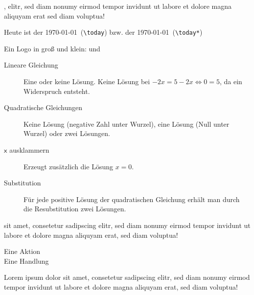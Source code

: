 \documentclass[
parindent=false,
parskip=true,
parts=true,
colortheme=wu,
styletheme=wu,
shownotess=true,
showresults=false
]{edu}
\begin{document}

 ,  \textrightarrow elitr, sed diam nonumy eirmod tempor invidunt ut labore et dolore magna aliquyam erat \textRightarrow sed diam voluptua! 

Heute ist der \today\ (\lstinline!\today!) bzw. der \today*\ (\lstinline!\today*!)

Ein Logo in groß und klein: \ccbysa und \ccbysa*
\begin{description}
	\item[Lineare Gleichung] Eine oder keine Lösung. Keine Lösung \zB bei $-2x = 5 - 2x \Leftrightarrow 0 = 5$, da ein Widerspruch entsteht.
	\item[Quadratische Gleichungen] Keine Lösung (negative Zahl unter Wurzel), eine Lösung (Null unter Wurzel) oder zwei Lösungen.
  \item[$\mathsf{x}$ ausklammern] Erzeugt zusätzlich die Lösung $x = 0$.
  \item[Substitution] Für jede positive Lösung der quadratischen Gleichung erhält man durch die Resubstitution zwei Lösungen.
\end{description}

 sit amet, consetetur sadipscing elitr, sed diam nonumy eirmod tempor invidunt ut labore et dolore magna aliquyam erat, sed diam voluptua!

\action Eine Aktion\\
\speech Eine Handlung


\newpage
Lorem ipsum dolor sit amet, consetetur sadipscing elitr, sed diam nonumy eirmod tempor invidunt ut labore et dolore magna aliquyam erat, sed diam voluptua! 
\end{document}
